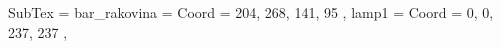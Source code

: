 SubTex = {
	bar_rakovina								= { Coord = { 204, 268, 141, 95 } },
	lamp1								= { Coord = { 0, 0, 237, 237 } },
}
